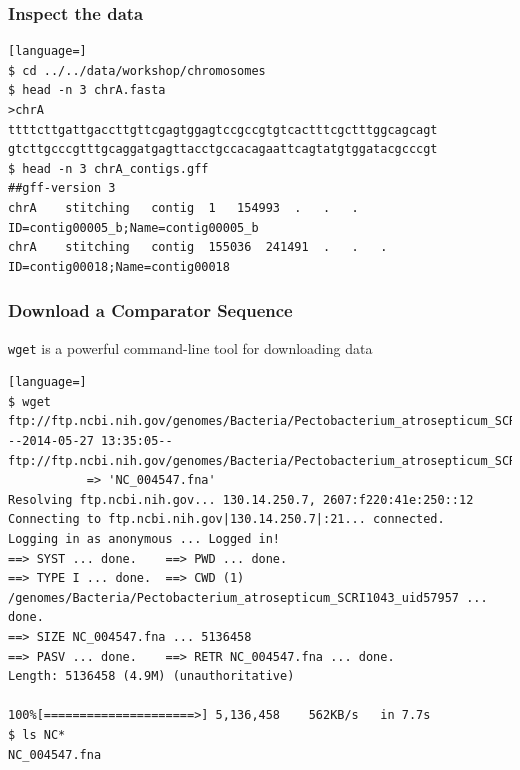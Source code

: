\documentclass[table]{beamer}
\begin{document}
\begin{frame}[fragile]
\frametitle{Inspect the data}
\begin{lstlisting}[language=]
$ cd ../../data/workshop/chromosomes
$ head -n 3 chrA.fasta 
>chrA
ttttcttgattgaccttgttcgagtggagtccgccgtgtcactttcgctttggcagcagt
gtcttgcccgtttgcaggatgagttacctgccacagaattcagtatgtggatacgcccgt
$ head -n 3 chrA_contigs.gff 
##gff-version 3
chrA	stitching	contig	1	154993	.	.	.	ID=contig00005_b;Name=contig00005_b
chrA	stitching	contig	155036	241491	.	.	.	ID=contig00018;Name=contig00018
\end{lstlisting}
\end{frame}

\begin{frame}[fragile]
\frametitle{Download a Comparator Sequence}
\texttt{wget} is a powerful command-line tool for downloading data
\begin{lstlisting}[language=]
$ wget ftp://ftp.ncbi.nih.gov/genomes/Bacteria/Pectobacterium_atrosepticum_SCRI1043_uid57957/NC_004547.fna
--2014-05-27 13:35:05--  ftp://ftp.ncbi.nih.gov/genomes/Bacteria/Pectobacterium_atrosepticum_SCRI1043_uid57957/NC_004547.fna
           => 'NC_004547.fna'
Resolving ftp.ncbi.nih.gov... 130.14.250.7, 2607:f220:41e:250::12
Connecting to ftp.ncbi.nih.gov|130.14.250.7|:21... connected.
Logging in as anonymous ... Logged in!
==> SYST ... done.    ==> PWD ... done.
==> TYPE I ... done.  ==> CWD (1) /genomes/Bacteria/Pectobacterium_atrosepticum_SCRI1043_uid57957 ... done.
==> SIZE NC_004547.fna ... 5136458
==> PASV ... done.    ==> RETR NC_004547.fna ... done.
Length: 5136458 (4.9M) (unauthoritative)

100%[=====================>] 5,136,458    562KB/s   in 7.7s 
$ ls NC*
NC_004547.fna
\end{lstlisting}
\end{frame}


\end{document}
